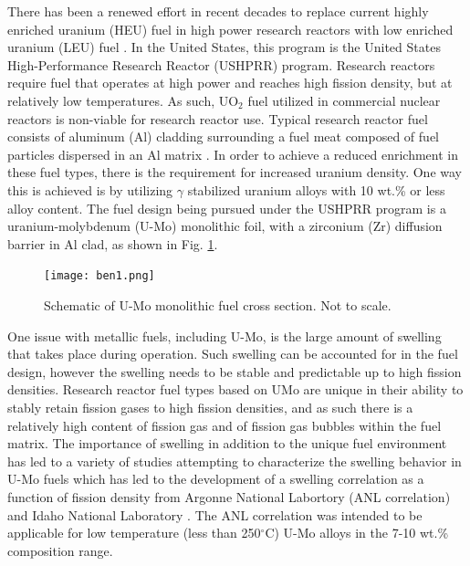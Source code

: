 \documentclass[review]{elsarticle}
\begin{document}
There has been a renewed effort in recent decades to replace current highly enriched uranium (HEU) fuel in high power research reactors with low enriched uranium (LEU) fuel \cite{snelgrove1997}. In the United States, this program is the United States High-Performance Research Reactor (USHPRR) program. Research reactors require fuel that operates at high power and reaches high fission density, but at relatively low temperatures. As such, UO$_{2}$ fuel utilized in commercial nuclear reactors is non-viable for research reactor use. Typical research reactor fuel consists of aluminum (Al) cladding surrounding a fuel meat composed of fuel particles dispersed in an Al matrix \cite{meyer2014}. In order to achieve a reduced enrichment in these fuel types, there is the requirement for increased uranium density. One way this is achieved is by utilizing $\gamma$ stabilized uranium alloys with 10 wt.\% or less alloy content. The fuel design being pursued under the USHPRR program is a uranium-molybdenum (U-Mo) monolithic foil, with a zirconium (Zr) diffusion barrier in Al clad, as shown in Fig. \ref{fig:ben1}. 

\begin{figure}[!h]
 \centering
 \texttt{[image: ben1.png]} 
 \caption{Schematic of U-Mo monolithic fuel cross section. Not to scale.}
 \label{fig:ben1}
\end{figure}

\FloatBarrier

One issue with metallic fuels, including U-Mo, is the large amount of swelling that takes place during operation\cite{hofman1997}. Such swelling can be accounted for in the fuel design, however the swelling needs to be stable and predictable up to high fission densities. Research reactor fuel types based on UMo are unique in their ability to stably retain fission gases to high fission densities, and as such there is a relatively high content of fission gas and of fission gas bubbles within the fuel matrix. The importance of swelling in addition to the unique fuel environment has led to a variety of studies attempting to characterize the swelling behavior in U-Mo fuels \cite{rest2009, kim_anl08, meyer2002, kim2013} which has led to the development of a swelling correlation as a function of fission density from Argonne National Labortory (ANL correlation) \cite{kim2011} and Idaho National Laboratory \cite{umo_prelim_report2017}. The ANL correlation was intended to be applicable for low temperature (less than 250$^{\circ}$C) U-Mo alloys in the 7-10 wt.\% composition range. 
\end{document}
